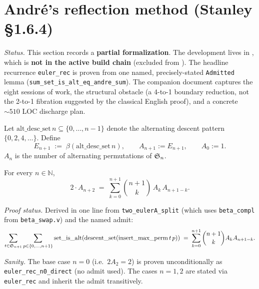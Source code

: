 \section{André's reflection method (Stanley \S1.6.4)}

\emph{Status.}  This section records a \textbf{partial formalization}.
The development lives in , which is
\textbf{not in the active build chain} (excluded from
).  The headline recurrence \texttt{euler\_rec} is
proven from one named, precisely-stated \texttt{Admitted} lemma
(\texttt{sum\_set\_is\_alt\_eq\_andre\_sum}).  The companion document
 captures the eight
sessions of work, the structural obstacle (a 4-to-1 boundary
reduction, not the 2-to-1 fibration suggested by the classical English
proof), and a concrete $\sim 510$ LOC discharge plan.

\begin{definition}
  \label{def:eulerA}
  Let $\mathrm{alt\_desc\_set}\,n \subseteq \{0, \dots, n-1\}$ denote
  the alternating descent pattern $\{0, 2, 4, \dots\}$.  Define
  \[
    E_{n+1}
    \;:=\;
    \beta(\mathrm{alt\_desc\_set}\,n),
    \qquad
    A_{n+1} := E_{n+1},
    \qquad
    A_0 := 1.
  \]
  $A_n$ is the number of alternating permutations of $\mathfrak{S}_{n}$.
\end{definition}

\begin{theorem}
  \label{thm:euler_rec}
  For every $n \in \mathbb{N}$,
  \[
    2 \cdot A_{n+2}
    \;=\;
    \sum_{k=0}^{n+1} \binom{n+1}{k} \, A_k \, A_{n+1-k}.
  \]

  \emph{Proof status.}  Derived in one line from \texttt{two\_eulerA\_split}
  (which uses \texttt{beta\_compl} from \texttt{beta\_swap.v}) and the
  named admit:
  \begin{equation}
    \label{eq:andre-admit}
    \sum_{t \in \mathfrak{S}_{n+1}} \sum_{p \in \{0,\dots,n+1\}}
       \mathrm{set\_is\_alt}(\mathrm{descent\_set}(\mathrm{insert\_max\_perm}\,t\,p))
    \;=\;
    \sum_{k=0}^{n+1} \binom{n+1}{k} A_k A_{n+1-k}.
  \end{equation}

  \emph{Sanity.}  The base case $n = 0$ (i.e.\ $2 A_2 = 2$) is proven
  unconditionally as \texttt{euler\_rec\_n0\_direct} (no admit used).
  The cases $n = 1, 2$ are stated via \texttt{euler\_rec} and inherit
  the admit transitively.
\end{theorem}

